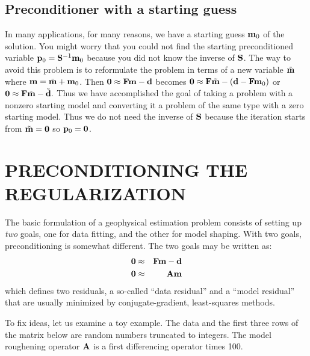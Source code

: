 \subsection{Preconditioner with a starting guess}

In many applications, for many reasons,
we have a starting guess $\bold m_0$ of the solution.
You might worry that
you could not find the starting preconditioned variable 
$\bold p_0= \bold S^{-1}\bold m_0$
because you did not know the inverse of $\bold S$.
The way to avoid this problem is to
reformulate the problem
in terms of a new variable $\tilde {\bold m}$
where
$ \bold m = \tilde {\bold m} + \bold m_0$.
Then 
$\bold 0\approx \bold F \bold m - \bold d$
becomes
$\bold 0\approx \bold F \tilde {\bold m} - (\bold d - \bold F \bold m_0)$
or
$\bold 0\approx \bold F \tilde {\bold m} - \tilde {\bold d}.$
Thus we have accomplished the goal of taking
a problem with a nonzero starting model
and converting it a problem of the same type
with a zero starting model.
Thus we do not need the inverse of $\bold S$
because the iteration starts from $\tilde {\bold m}=\bold 0$
so $\bold p_0 = \bold 0$.



\section{PRECONDITIONING THE REGULARIZATION}


\par
The basic formulation of a geophysical estimation problem
consists of setting up
{\em  two}
goals,
one for data fitting,
and the other for model shaping.
With two goals, preconditioning is somewhat different.
The two goals may be written as:
\begin{eqnarray}
\bold 0 &\approx& \bold F \bold m - \bold d \\
\bold 0 &\approx& \bold A \bold m
\end{eqnarray}
which defines two residuals,
a so-called ``data residual'' and a ``model residual'' that
are usually minimized by conjugate-gradient, least-squares methods.
\par
To fix ideas, let us examine a toy example.
The data and the first three rows of the matrix below
are random numbers truncated to integers.
The model roughening operator $\bold A$
is a first differencing operator times 100.

